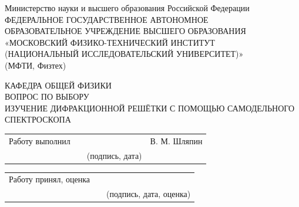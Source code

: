 \documentclass[a4paper, 12pt]{article}
\begin{document}
    \begin{center}
        {Министерство науки и высшего образования Российской Федерации}\\
        {ФЕДЕРАЛЬНОЕ ГОСУДАРСТВЕННОЕ АВТОНОМНОЕ}\\ 
        {ОБРАЗОВАТЕЛЬНОЕ УЧРЕЖДЕНИЕ ВЫСШЕГО ОБРАЗОВАНИЯ}\\
        {«МОСКОВСКИЙ ФИЗИКО-ТЕХНИЧЕСКИЙ ИНСТИТУТ}\\
        {(НАЦИОНАЛЬНЫЙ ИССЛЕДОВАТЕЛЬСКИЙ УНИВЕРСИТЕТ)»}\\
        {(МФТИ, Физтех)}\\
    \end{center}
    
    \vspace{14em}
    
    \begin{center}
        {КАФЕДРА ОБЩЕЙ ФИЗИКИ}\\ %
        {ВОПРОС ПО ВЫБОРУ}\\
        {ИЗУЧЕНИЕ ДИФРАКЦИОННОЙ РЕШЁТКИ С ПОМОЩЬЮ САМОДЕЛЬНОГО СПЕКТРОСКОПА}\\
    \end{center}
    
    \vspace{15em} %
    
    \normalsize
    { 
    \begin{tabular}{ m{5cm} m{1.5cm} l m{4cm} }
        Работу выполнил %
        & & \underline{\hspace{3.8cm}} & В. М. Шляпин \\
        & & \hspace{0.7632cm}\footnotesize{(подпись, дата)} & 
    \end{tabular}
    }

    \vspace{1em}

    \normalsize
    { 
    \begin{tabular}{ m{5cm} m{1.5cm} l }
        Работу принял, оценка & & \underline{\hspace{7.2cm}} \\
        & &\hspace{0.7632cm}\footnotesize{(подпись, дата, оценка)} 
    \end{tabular}
    }
    
\end{document}
